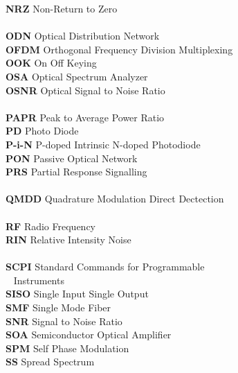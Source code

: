 \begin{multicols}{2}
\begin{tabbing}
\textbf{NRZ}		\>	Non-Return to Zero								\\
\\
\textbf{ODN}		\>	Optical Distribution Network					\\
\textbf{OFDM}		\>	Orthogonal Frequency Division Multiplexing		\\
\textbf{OOK}		\>	On Off Keying									\\
\textbf{OSA}		\>	Optical Spectrum Analyzer						\\
\textbf{OSNR}		\>	Optical Signal to Noise Ratio					\\
\\
\textbf{PAPR}		\>	Peak to Average Power Ratio						\\
\textbf{PD}			\>	Photo Diode										\\
\textbf{P-i-N}		\>	P-doped Intrinsic N-doped Photodiode			\\
\textbf{PON}		\>	Passive Optical Network							\\
\textbf{PRS}		\>	Partial Response Signalling						\\
\\
\textbf{QMDD}		\>	Quadrature Modulation Direct Dectection			\\
\\
\textbf{RF}			\>	Radio Frequency									\\
\textbf{RIN}		\>	Relative Intensity Noise						\\
\\
\textbf{SCPI}		\>	Standard Commands for Programmable					\\
~			\>	Instruments								\\
\textbf{SISO}		\>	Single Input Single Output						\\
\textbf{SMF}		\>	Single Mode Fiber								\\
\textbf{SNR}		\>	Signal to Noise Ratio							\\
\textbf{SOA}		\>	Semiconductor Optical Amplifier					\\
\textbf{SPM}		\>	Self Phase Modulation							\\
\textbf{SS}			\>	Spread Spectrum									\\

\end{tabbing}
\end{multicols}
